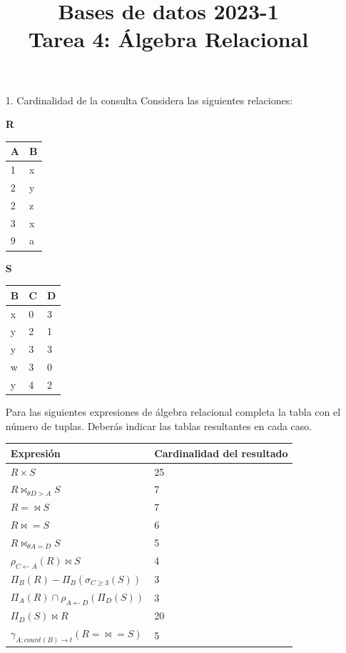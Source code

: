 \documentclass[12pt,a4paper]{article}
\title{Bases de datos 2023-1\\
Tarea 4: Álgebra Relacional}
\begin{document}
\maketitle

\begin{enumerate}
	\item[1.] Cardinalidad de la consulta
		Considera las siguientes relaciones:\\

		\begin{minipage}{0.5\textwidth}
		\textbf{R}\\
		\begin{tabular}{|l|l|}
			\hline
			A	& B\\
			\hline
			1	& x\\
			2	& y\\
			2	& z\\
			3	& x\\
			9	& a\\
			\hline
		\end{tabular}
		\end{minipage}
		\begin{minipage}{0.5\textwidth}
		\textbf{S}\\
		\begin{tabular}{|l|l|l|}
			\hline
			B	& C	& D\\
			\hline
			x	& 0	& 3\\
			y	& 2	& 1\\
			y	& 3	& 3\\
			w	& 3	& 0\\
			y	& 4	& 2\\
			\hline
		\end{tabular}
		\end{minipage}

		Para las siguientes expresiones de álgebra relacional completa la tabla con el número de tuplas.
		Deberás indicar las tablas resultantes en cada caso.\\
		\begin{tabular}{|l|l|}
			\hline
			Expresión		& Cardinalidad del resultado\\
			\hline
			$R \times S$											& 25\\
			$R \bowtie_{\theta D > A} S$							& 7\\
			$R =\bowtie  S$											& 7\\
			$R \bowtie=  S$											& 6\\
			$R \bowtie_{\theta A=D} S$								& 5\\
			$\rho_{C \leftarrow A}(R) \bowtie S$					& 4\\
			$\Pi_B (R) - \Pi_B (\sigma_{C \geq 3} (S))$				& 3\\
			$\Pi_A (R) \cap \rho_{A \leftarrow D} (\Pi_D (S))$		& 3\\
			$\Pi_D (S) \bowtie R$									&20\\
			$\gamma_{A ; count(B) \rightarrow t} (R =\bowtie= S)$	&5\\
			\hline
		\end{tabular}


\end{enumerate}
\end{document}
